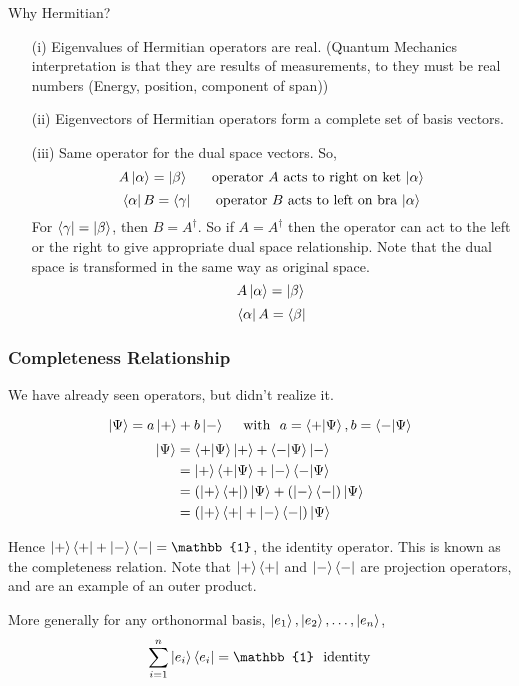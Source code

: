 \documentclass[english, 11pt]{article}
\begin{document}
        Why Hermitian?
        \begin{itemize}
          \item[(i)] Eigenvalues of Hermitian operators are real. (Quantum Mechanics interpretation is that they are results of measurements, to they must be real numbers (Energy, position, component of span))
          \item[(ii)] Eigenvectors of Hermitian operators form a complete set of basis vectors.
          \item[(iii)] Same operator for the dual space vectors. So,
          \[ A\left|\alpha\right\rangle = \left|\beta\right\rangle \ \ \ \ \ \mbox{operator $A$ acts to right on ket $\left|\alpha\right\rangle$} \]
          \[ \left\langle\alpha\right|B = \left\langle\gamma\right| \ \ \ \ \ \mbox{operator $B$ acts to left on bra $\left|\alpha\right\rangle$} \]
          For $\left\langle\gamma\right| = \left|\beta\right\rangle$, then $B = A^\dagger$. So if $A = A^\dagger$ then the operator can act to the left or the right to give appropriate dual space relationship. Note that the dual space is transformed in the same way as original space.
          \[ A\left|\alpha\right\rangle = \left| \beta \rangle \right. \]
          \[ \left\langle\alpha\right|A = \left\langle\beta\right| \]
        \end{itemize}

      \subsubsection{Completeness Relationship}

        We have already seen operators, but didn't realize it.

        \[ \kpsi = a\kp + b\km \mbox{ \ \ \ with \ } a = \braket{+}{\Psi}, b = \braket{-}{\Psi} \]
        \begin{align*}
          \kpsi & = \braket{+}{\Psi}\ket{+} + \braket{-}{\Psi}\km \\
          & = \kp\braket{+}{\Psi} + \ket{-}\braket{-}{\Psi} \\
          & = \left( \ket{+}\bra{+} \right) \kpsi + \left( \ket{-}\bra{-} \right) \kpsi \\
          & = \left( \ket{+}\bra{+} + \ket{-}\bra{-} \right)\kpsi
        \end{align*}

        Hence $\ket{+}\bra{+} + \ket{-}\bra{-} = \mathbb{1}$, the identity operator. This is known as the completeness relation. Note that $\left|+\right\rangle\left\langle+\right|$ and $\left|-\right\rangle\left\langle-\right|$ are projection operators, and are an example of an outer product.

        More generally for any orthonormal basis, $\left|e_1\right\rangle, \left|e_2\right\rangle, \ldots, \left|e_n\right\rangle$,
        \[ \sum_{i=1}^n \ket{e_i}\bra{e_i} = \mathbb{1} \ \ \mbox{identity} \]
\end{document}
